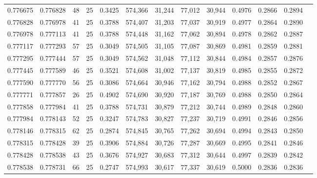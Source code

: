 \begin{tabular}{rrrrrrrrrrrrr}
0.776675 & 0.776828 &    48 &  25 &                                     0.3425 & 574,366 &  31,244 &  77,012 &  30,944 & 0.4976 & 0.2866 & 0.2894 \\
0.776828 & 0.776978 &    41 &  25 &                                     0.3788 & 574,407 &  31,203 &  77,037 &  30,919 & 0.4977 & 0.2864 & 0.2890 \\
0.776978 & 0.777113 &    41 &  25 &                                     0.3788 & 574,448 &  31,162 &  77,062 &  30,894 & 0.4978 & 0.2862 & 0.2887 \\
0.777117 & 0.777293 &    57 &  25 &                                     0.3049 & 574,505 &  31,105 &  77,087 &  30,869 & 0.4981 & 0.2859 & 0.2881 \\
0.777295 & 0.777444 &    57 &  25 &                                     0.3049 & 574,562 &  31,048 &  77,112 &  30,844 & 0.4984 & 0.2857 & 0.2876 \\
0.777445 & 0.777589 &    46 &  25 &                                     0.3521 & 574,608 &  31,002 &  77,137 &  30,819 & 0.4985 & 0.2855 & 0.2872 \\
0.777590 & 0.777770 &    56 &  25 &                                     0.3086 & 574,664 &  30,946 &  77,162 &  30,794 & 0.4988 & 0.2852 & 0.2867 \\
0.777771 & 0.777857 &    26 &  25 &                                     0.4902 & 574,690 &  30,920 &  77,187 &  30,769 & 0.4988 & 0.2850 & 0.2864 \\
0.777858 & 0.777984 &    41 &  25 &                                     0.3788 & 574,731 &  30,879 &  77,212 &  30,744 & 0.4989 & 0.2848 & 0.2860 \\
0.777984 & 0.778143 &    52 &  25 &                                     0.3247 & 574,783 &  30,827 &  77,237 &  30,719 & 0.4991 & 0.2846 & 0.2856 \\
0.778146 & 0.778315 &    62 &  25 &                                     0.2874 & 574,845 &  30,765 &  77,262 &  30,694 & 0.4994 & 0.2843 & 0.2850 \\
0.778315 & 0.778428 &    39 &  25 &                                     0.3906 & 574,884 &  30,726 &  77,287 &  30,669 & 0.4995 & 0.2841 & 0.2846 \\
0.778428 & 0.778538 &    43 &  25 &                                     0.3676 & 574,927 &  30,683 &  77,312 &  30,644 & 0.4997 & 0.2839 & 0.2842 \\
0.778538 & 0.778731 &    66 &  25 &                                     0.2747 & 574,993 &  30,617 &  77,337 &  30,619 & 0.5000 & 0.2836 & 0.2836 \\

\end{tabular}
